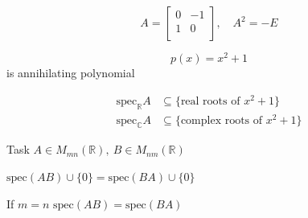 \documentclass[fullscreen=true, bookmarks=true, hyperref={pdfencoding=unicode}]{beamer}
\begin{document}
\begin{frame}
  \begin{example}
    $$A = \begin{bmatrix}
      0 & -1 \\
      1 &  0 \\
    \end{bmatrix}, \quad A^2 = -E
    $$
  
    $$p(x) = x^2 + 1$$
    is annihilating polynomial

    \begin{align*}
      \mathrm{spec}_{\mathbb{R}} A &\subseteq \{\text{real roots of } x^2+1 \}\\
      \mathrm{spec}_{\mathbb{C}} A &\subseteq \{\text{complex roots of } x^2+1 \}
    \end{align*}
  \end{example}
\end{frame}
  

\begin{frame}
  \begin{block}{Task}
    $A \in M_{mn}(\mathbb{R}),\ B \in M_{nm}(\mathbb{R})$

    $\mathrm{spec}(AB) \cup \{0\} = \mathrm{spec}(BA) \cup \{0\}$

    If $m=n$ $\mathrm{spec}(AB) = \mathrm{spec}(BA)$
  \end{block}
\end{frame}
\end{document}
